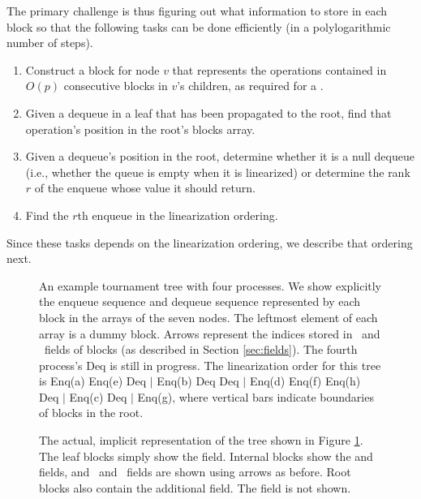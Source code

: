 The primary challenge is thus figuring out what information to store in each block so that 
the following tasks can be done efficiently (in a polylogarithmic number of steps).
\begin{enumerate}[label={(T\arabic*)}]
\item
\label{construct}
Construct a block for node $v$ that represents the operations contained in $O(p)$ consecutive blocks in $v$'s children, as required for a .
\item
\label{findinroot}
Given a dequeue in a leaf that has been propagated to the root, find that operation's position in the root's blocks array.
\item
\label{findrank}
Given a dequeue's position in the root, determine whether it is a null dequeue (i.e., whether the queue is empty when it is linearized)
or determine the rank $r$ of the enqueue whose value it should return.
\item
\label{findenqueue}
Find the $r$th enqueue in the linearization ordering.
\end{enumerate}
Since these tasks depends on the linearization ordering, we describe that ordering next.

\begin{figure}[tb]

\caption{An example tournament tree with four processes. 
We show explicitly the enqueue sequence and dequeue sequence represented by each block in the  arrays of the seven nodes.  The leftmost element of each  array is a dummy block.
Arrows represent the indices stored in \eleft\ and \eright\ fields of blocks (as described in Section \ref{sec:fields}).
The fourth process's Deq is still in progress.
The linearization order for this tree is
Enq(a) Enq(e) Deq $\mid$ Enq(b) Deq Deq $\mid$ Enq(d) Enq(f) Enq(h) Deq $\mid$ Enq(c) Deq $\mid$ Enq(g), where vertical bars indicate boundaries of blocks in the root.\label{tournament}}
\end{figure}

\begin{figure}

\caption{\label{implicit}The actual, implicit representation of the tree shown in Figure \ref{tournament}.
The leaf blocks simply show the  field.
Internal blocks show the  and  fields,
and \eleft\ and \eright\ fields are shown using arrows as before.
Root blocks also contain the additional  field.
The  field is not shown.}
\end{figure}

